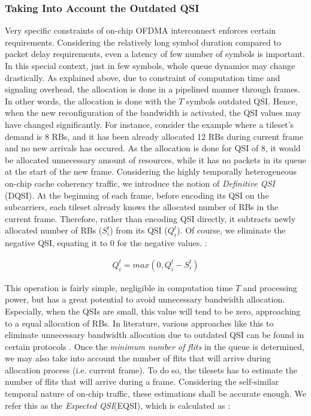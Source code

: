 \subsubsection{Taking Into Account the Outdated QSI}

Very specific constraints of on-chip OFDMA interconnect enforces certain requirements. Considering the relatively long symbol duration compared to packet delay requirements, even a latency of few number of symbols is important. In this special context, just in few symbols, whole queue dynamics may change drastically. As explained above, due to constraint of computation time and signaling overhead, the allocation is done in a pipelined manner through frames. In other words, the allocation is done with the $T$ symbols outdated QSI. Hence, when the new reconfiguration of the bandwidth is activated, the QSI values may have changed significantly. For instance, consider the example where a tileset's demand is 8 RBs, and it has been already allocated 12 RBs during current frame and no new arrivals has occured. As the allocation is done for QSI of 8, it would be allocated unnecessary amount of resources, while it has no packets in its queue at the start of the new frame. Considering the highly temporally heterogeneous on-chip cache coherency traffic, we introduce the notion of \textit{Definitive QSI} (DQSI). At the beginning of each frame, before encoding its QSI on the subcarriers, each tileset already knows the allocated number of RBs in the current frame. Therefore, rather than encoding QSI directly, it subtracts newly allocated number of RBs ($S_{i}^{t}$) from its QSI ($Q_{i}^{t}$). Of course, we eliminate the negative QSI, equating it to 0 for the negative values.  : 

\begin{align}
Q_{i}^{t} = max(0, Q_{i}^{t} - S_{i}^{t})
\end{align} 

This operation is fairly simple, negligible in computation time $T$ and processing power, but has a great potential to avoid unnecessary bandwidth allocation. Especially, when the QSIs are small, this value will tend to be zero, approaching to a equal allocation of RBs. In literature, various approaches like this to eliminate unnecessary bandwidth allocation due to outdated QSI can be found in certain protocols \cite{zhu2014cross}\cite{ansel2006fhcf}. Once the \textit{minimum number of flits} in the queue is determined, we may also take into account the number of flits that will arrive during allocation process (i.e. current frame). To do so, the tilesets has to estimate the number of flits that will arrive during a frame. Considering the self-similar temporal nature of on-chip traffic, these estimations shall be accurate enough. We refer this as the \textit{Expected QSI}(EQSI), which is calculated as :

